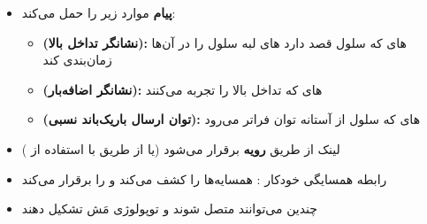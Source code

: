 
\begin{itemize}
\tightlist
\item
  \textbf{پیام } موارد زیر را حمل می‌کند:

  \begin{itemize}
  \tightlist
  \item
    \textbf{ (نشانگر تداخل بالا):} های  که سلول قصد دارد های لبه سلول را در آن‌ها زمان‌بندی کند
  \item
    \textbf{ (نشانگر اضافه‌بار):} های  که تداخل بالا را تجربه می‌کنند
  \item
    \textbf{ (توان ارسال باریک‌باند نسبی):} های  که سلول از آستانه توان فراتر می‌رود
  \end{itemize}
\end{itemize}


\begin{itemize}
\tightlist
\item
  لینک  از طریق \textbf{رویه } برقرار می‌شود (یا از طریق  با استفاده از )
\item
  رابطه همسایگی خودکار :  همسایه‌ها را کشف می‌کند و  را برقرار می‌کند
\item
  چندین  می‌توانند متصل شوند و توپولوژی مَش تشکیل دهند
\end{itemize}




\CNchained{}




